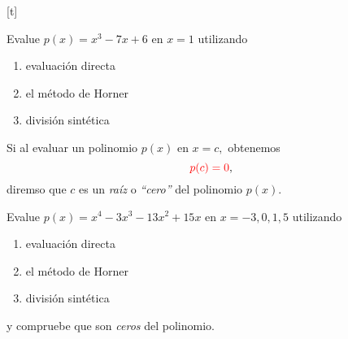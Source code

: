 [t]
	\begin{problema}
		Evalue $p(x)=x^{3}-7x+6$ en $x=1$ utilizando
		\begin{enumerate}
			\item evaluaci\'on directa 
			\item el m\'etodo de Horner 
			\item divisi\'on sint\'etica
		\end{enumerate} 
	\end{problema}



	\begin{defn}
		Si al evaluar un polinomio $p(x)$ en $x=c,$ obtenemos 
		$$
		{\color{red} p(c)=0},
		$$
		diremso que $c$ es un \emph{ra\'iz} o \emph{``cero''} del polinomio $p(x).$
	\end{defn}



	\begin{problema}
		Evalue $p(x)=x^{4}-3x^{3}-13x^{2}+15x$ en $x=-3,0,1,5$ utilizando
		\begin{enumerate}
			\item evaluaci\'on directa 
			\item el m\'etodo de Horner 
			\item divisi\'on sint\'etica
		\end{enumerate} 
	\end{problema} y compruebe que son \emph{ceros} del polinomio.

